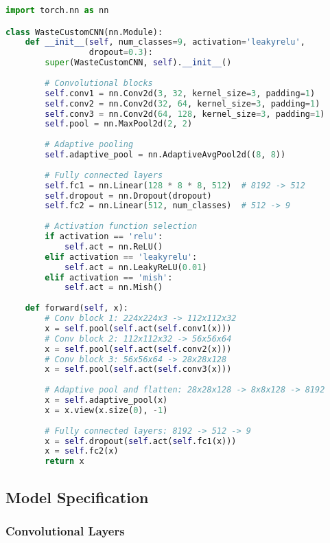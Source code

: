 \documentclass[12pt,a4paper]{article}
\begin{document}
\begin{lstlisting}[language=Python, caption=WasteCustomCNN Model Architecture, frame=single]
import torch.nn as nn

class WasteCustomCNN(nn.Module):
    def __init__(self, num_classes=9, activation='leakyrelu', 
                 dropout=0.3):
        super(WasteCustomCNN, self).__init__()
        
        # Convolutional blocks
        self.conv1 = nn.Conv2d(3, 32, kernel_size=3, padding=1)
        self.conv2 = nn.Conv2d(32, 64, kernel_size=3, padding=1)
        self.conv3 = nn.Conv2d(64, 128, kernel_size=3, padding=1)
        self.pool = nn.MaxPool2d(2, 2)
        
        # Adaptive pooling
        self.adaptive_pool = nn.AdaptiveAvgPool2d((8, 8))
        
        # Fully connected layers
        self.fc1 = nn.Linear(128 * 8 * 8, 512)  # 8192 -> 512
        self.dropout = nn.Dropout(dropout)
        self.fc2 = nn.Linear(512, num_classes)  # 512 -> 9
        
        # Activation function selection
        if activation == 'relu':
            self.act = nn.ReLU()
        elif activation == 'leakyrelu':
            self.act = nn.LeakyReLU(0.01)
        elif activation == 'mish':
            self.act = nn.Mish()
    
    def forward(self, x):
        # Conv block 1: 224x224x3 -> 112x112x32
        x = self.pool(self.act(self.conv1(x)))
        # Conv block 2: 112x112x32 -> 56x56x64
        x = self.pool(self.act(self.conv2(x)))
        # Conv block 3: 56x56x64 -> 28x28x128
        x = self.pool(self.act(self.conv3(x)))
        
        # Adaptive pool and flatten: 28x28x128 -> 8x8x128 -> 8192
        x = self.adaptive_pool(x)
        x = x.view(x.size(0), -1)
        
        # Fully connected layers: 8192 -> 512 -> 9
        x = self.dropout(self.act(self.fc1(x)))
        x = self.fc2(x)
        return x
\end{lstlisting}
\subsection{Model Specification}
\subsubsection{Convolutional Layers}
\end{document}
